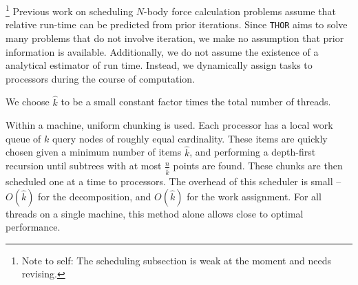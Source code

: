 \documentclass[twoside,leqno,twocolumn]{article}
\newcommand{\THOR}{{{\tt THOR}} }
\newcommand{\authornote}[1]{\footnote{Note to self: #1}}
\newcommand{\authorsnote}[1]{\authornote{#1}}
\begin{document}
\authorsnote{The scheduling subsection is weak at the moment and needs revising.}
Previous work \cite{salmon_thesis, singh_thesis} on scheduling $N$-body force calculation problems assume that relative run-time can be predicted from prior iterations.
Since \THOR aims to solve many problems that do not involve iteration, we make no assumption that prior information is available.
Additionally, we do not assume the existence of a analytical estimator of run time.
Instead, we dynamically assign tasks to processors during the course of computation.

We choose $\hat{k}$ to be a small constant factor times the total number of threads.

Within a machine, uniform chunking is used\cite{uniform_chunking}.
Each processor has a local work queue of $k$ query nodes of roughly equal cardinality.
These items are quickly chosen given a minimum number of items $\hat{k}$, and performing a depth-first recursion until subtrees with at most $\frac{n}{\hat{k}}$ points are found.
These chunks are then scheduled one at a time to processors.
The overhead of this scheduler is small -- $O(\hat{k})$ for the decomposition, and $O(\hat{k})$ for the work assignment.
For all threads on a single machine, this method alone allows close to optimal performance.
\end{document}
